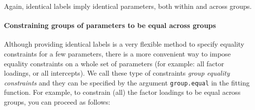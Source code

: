 Again, identical labels imply identical parameters, both within and
across groups.

\paragraph{Constraining groups of parameters to be equal across groups}

Although providing identical labels is a very flexible method to specify
equality constraints for a few parameters, there is a more convenient
way to impose equality constraints on a whole set of parameters (for
example: all factor loadings, or all intercepts). We call these type of
constraints \emph{group equality constraints} and they can be specified
by the argument \texttt{group.equal} in the fitting function. For
example, to constrain (all) the factor loadings to be equal across
groups, you can proceed as follows:

\begin{Shaded}
\begin{Highlighting}[]
\StringTok{ }
            
            \NormalTok{,}
            \NormalTok{(}\NormalTok{))}
\end{Highlighting}
\end{Shaded}

